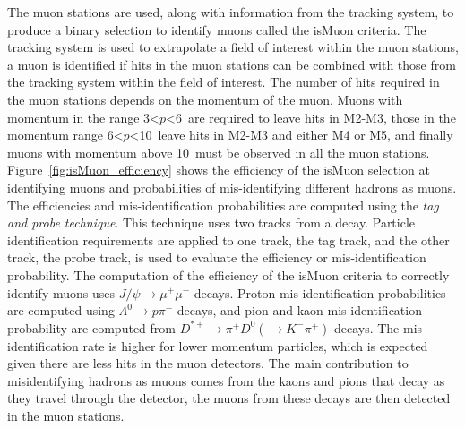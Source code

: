 The muon stations are used, along with information from the tracking system, to produce a binary selection to identify muons called the isMuon criteria. The tracking system is used to extrapolate a field of interest within the muon stations, a muon is identified if hits in the muon stations can be combined with those from the tracking system within the field of interest. The number of hits required in the muon stations depends on the momentum of the muon. Muons with momentum in the range 3<$p$<6~\gevc are required to leave hits in M2-M3, those in the momentum range 6<$p$<10~\gevc leave hits in M2-M3 and either M4 or M5, and finally muons with momentum above 10~\gevc must be observed in all the muon stations. Figure~\ref{fig:isMuon_efficiency} shows the efficiency of the isMuon selection at identifying muons and probabilities of mis-identifying different hadrons as muons. The efficiencies and mis-identification probabilities are computed using the {\it tag and probe technique}. This technique uses two tracks from a decay. Particle identification requirements are applied to one track, the tag track, and the other track, the probe track, is used to evaluate the efficiency or mis-identification probability. The computation of the efficiency of the isMuon criteria to correctly identify muons uses $J/\psi \to \mu^+ \mu^-$ decays. Proton mis-identification probabilities are computed using $\Lambda^0 \to p \pi^-$ decays, and pion and kaon mis-identification probability are computed from $D^{*+} \to \pi^+ D^0 (\to K^- \pi^+)$ decays. The mis-identification rate is higher for lower momentum particles, which is expected given there are less hits in the muon detectors. The main contribution to misidentifying hadrons as muons comes from the kaons and pions that decay as they travel through the detector, the muons from these decays are then detected in the muon stations.


